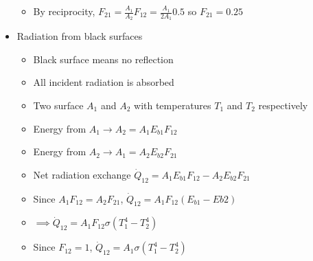 \documentclass[12pt]{article}
\begin{document}
\begin{itemize}
\begin{itemize}
        \item By reciprocity, $F_{21} = \frac{A_1}{A_2} F_{12} = \frac{A_1}{2 A_1} 0.5$ so $F_{21} = 0.25$
    \end{itemize}
    \item Radiation from black surfaces \begin{itemize}
        \item Black surface means no reflection 
        \item All incident radiation is absorbed 
        \item Two surface $A_1$ and $A_2$ with temperatures $T_1$ and $T_2$ respectively 
        \item Energy from $A_1 \rightarrow A_2 = A_1 E_{b1} F_{12}$
        \item Energy from $A_2 \rightarrow A_1 = A_2 E_{b2} F_{21}$ 
        \item Net radiation exchange $\dot{Q}_{12} = A_1 E_{b1} F_{12} - A_2 E_{b2} F_{21}$ 
        \item Since $A_1 F_{12} = A_2 F_{21}$, $\dot{Q}_{12} = A_1 F_{12} (E_{b1} - E{b2})$
        \item $\implies \dot{Q}_{12} = A_1 F_{12} \sigma (T_1^4 - T_2^4)$
        \item Since $F_{12} = 1$, $\dot{Q}_{12} = A_1 \sigma (T_1^4 - T_2^4)$
    \end{itemize}
    
\end{itemize}
\end{document}
